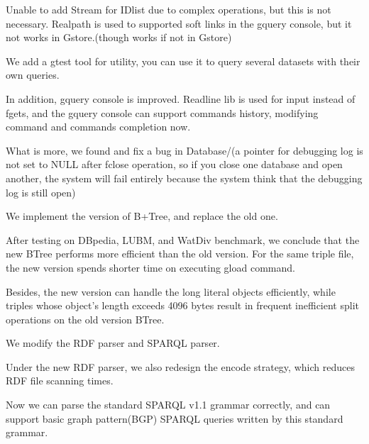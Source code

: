 \documentclass[titlepage, a4paper, 12pt]{article}
\begin{document}
Unable to add Stream for IDlist due to complex operations, but this is
not necessary. Realpath is used to supported soft links in the gquery
console, but it not works in Gstore.(though works if not in Gstore)


We add a gtest tool for utility, you can use it to query several
datasets with their own queries.

In addition, gquery console is improved. Readline lib is used for input
instead of fgets, and the gquery console can support commands history,
modifying command and commands completion now.

What is more, we found and fix a bug in Database/(a pointer for
debugging log is not set to NULL after fclose operation, so if you close
one database and open another, the system will fail entirely because the
system think that the debugging log is still open)


We implement the version of B+Tree, and replace the old one.

After testing on DBpedia, LUBM, and WatDiv benchmark, we conclude that
the new BTree performs more efficient than the old version. For the
same triple file, the new version spends shorter time on executing gload
command.

Besides, the new version can handle the long literal objects
efficiently, while triples whose object's length exceeds 4096 bytes
result in frequent inefficient split operations on the old version
BTree.


We modify the RDF parser and SPARQL parser.

Under the new RDF parser, we also redesign the encode strategy, which
reduces RDF file scanning times.

Now we can parse the standard SPARQL v1.1 grammar correctly, and can
support basic graph pattern(BGP) SPARQL queries written by this standard
grammar.
\end{document}
